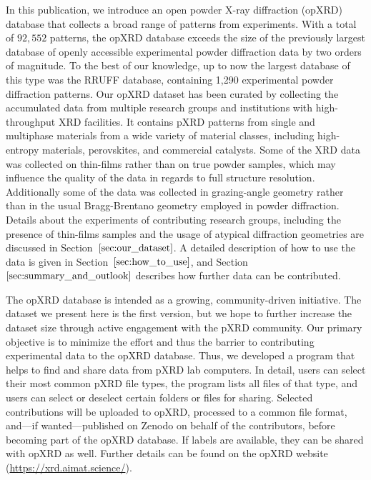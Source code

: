In this publication, we introduce an open powder X-ray diffraction (opXRD) database that collects a broad range of patterns from experiments. With a total of $92,552$ patterns, the opXRD database exceeds the size of the previously largest database of openly accessible experimental powder diffraction data by two orders of magnitude. To the best of our knowledge, up to now the largest database of this type was the RRUFF database, containing 1,290 experimental powder diffraction patterns. Our opXRD dataset has been curated by collecting the accumulated data from multiple research groups and institutions with high-throughput XRD facilities. It contains pXRD patterns from single and multiphase materials from a wide variety of material classes, including high-entropy materials, perovskites, and commercial catalysts. Some of the XRD data was collected on thin-films rather than on true powder samples, which may influence the quality of the data in regards to full structure resolution. Additionally some of the data was collected in grazing-angle geometry rather than in the usual Bragg-Brentano geometry employed in powder diffraction. Details about the experiments of contributing research groups, including the presence of thin-films samples and the usage of atypical diffraction geometries are discussed in Section~$\eqref{sec:our_dataset}$. A detailed description of how to use the data is given in Section~$\eqref{sec:how_to_use}$, and Section~$\eqref{sec:summary_and_outlook}$ describes how further data can be contributed.

The opXRD database is intended as a growing, community-driven initiative. The dataset we present here is the first version, but we hope to further increase the dataset size through active engagement with the pXRD community. Our primary objective is to minimize the effort and thus the barrier to contributing experimental data to the opXRD database. Thus, we developed a program that helps to find and share data from pXRD lab computers. In detail, users can select their most common pXRD file types, the program lists all files of that type, and users can select or deselect certain folders or files for sharing. Selected contributions will be uploaded to opXRD, processed to a common file format, and---if wanted---published on Zenodo on behalf of the contributors, before becoming part of the opXRD database. If labels are available, they can be shared with opXRD as well. Further details can be found on the opXRD website (\url{https://xrd.aimat.science/}).  \\


